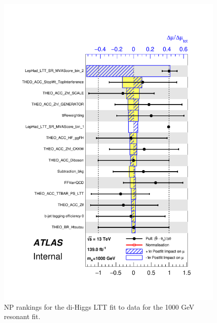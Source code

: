 \begin{figure}
\centering
\includegraphics[width=.8\textwidth]{figures/results/HH/LepHad/pulls_SigXsecOverSM_1000_LTT.pdf}
\caption{NP rankings for the di-Higgs \lephad LTT fit to data for the 1000 GeV resonant fit.}
\label{fig:LepHadPostfitNPRankings2HDM1000LTT}
\end{figure}

